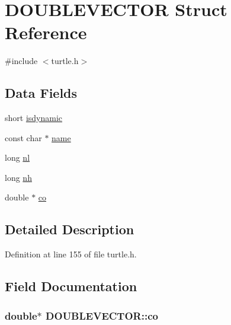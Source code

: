 \hypertarget{struct_d_o_u_b_l_e_v_e_c_t_o_r}{\section{D\-O\-U\-B\-L\-E\-V\-E\-C\-T\-O\-R Struct Reference}
\label{struct_d_o_u_b_l_e_v_e_c_t_o_r}
}


{\ttfamily \#include $<$turtle.\-h$>$}

\subsection*{Data Fields}
\begin{DoxyCompactItemize}
\item 
short \hyperlink{struct_d_o_u_b_l_e_v_e_c_t_o_r_ac88bf29d0bc7971cda775ab09b221467}{isdynamic}
\item 
const char $\ast$ \hyperlink{struct_d_o_u_b_l_e_v_e_c_t_o_r_a4a57e36648cfefcec7ed33528e2547b1}{name}
\item 
long \hyperlink{struct_d_o_u_b_l_e_v_e_c_t_o_r_adcb6f52f9d62535f5aaaca09579ea005}{nl}
\item 
long \hyperlink{struct_d_o_u_b_l_e_v_e_c_t_o_r_ab4b5a73bacbe4a88ccc31d8666826756}{nh}
\item 
double $\ast$ \hyperlink{struct_d_o_u_b_l_e_v_e_c_t_o_r_a3c068b99cb648684ef8c6ec64d4d4745}{co}
\end{DoxyCompactItemize}


\subsection{Detailed Description}


Definition at line 155 of file turtle.\-h.



\subsection{Field Documentation}
\hypertarget{struct_d_o_u_b_l_e_v_e_c_t_o_r_a3c068b99cb648684ef8c6ec64d4d4745}{
\subsubsection[{co}]{\setlength{\rightskip}{0pt plus 5cm}double$\ast$ D\-O\-U\-B\-L\-E\-V\-E\-C\-T\-O\-R\-::co}}\label{struct_d_o_u_b_l_e_v_e_c_t_o_r_a3c068b99cb648684ef8c6ec64d4d4745}


